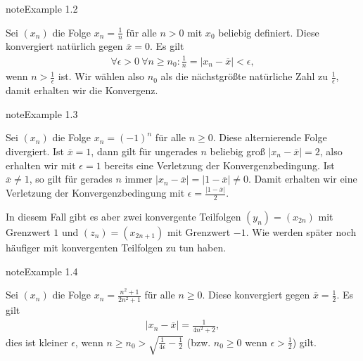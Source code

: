 \documentclass[letterpaper,10pt,english]{jupyterBook}
\begin{document}
\label{vorkurs/folgen:example-2}
\begin{sphinxadmonition}{note}{Example 1.2}



Sei \((x_n)\) die  Folge \(x_n = \frac{1}n \) für alle \(n>0\) mit \(x_0\) beliebig definiert. Diese konvergiert natürlich gegen \(\overline{x} = 0\). Es gilt
\begin{equation*}
\begin{split} \forall \epsilon > 0 ~\forall n \geq n_0:  \frac{1}n = \vert x_n - \overline{x}\vert < \epsilon, \end{split}
\end{equation*}
wenn \(n > \frac{1}\epsilon\) ist. Wir wählen also \(n_0\) als die nächstgrößte natürliche Zahl zu \(\frac{1}\epsilon\), damit erhalten wir die Konvergenz.
\end{sphinxadmonition}
\label{vorkurs/folgen:example-3}
\begin{sphinxadmonition}{note}{Example 1.3}



Sei \((x_n)\) die  Folge \(x_n = (-1)^n \) für alle \(n\geq 0\). Diese alternierende Folge divergiert. Ist \(\overline{x} = 1\), dann gilt für ungerades \(n\) beliebig groß \(\vert x_n - \overline{x}\vert = 2\), also erhalten wir mit \(\epsilon =1\) bereits eine Verletzung der Konvergenzbedingung. Ist \(\overline{x} \neq 1\), so gilt für gerades \(n\) immer \(\vert x_n - \overline{x} \vert =  \vert 1-\overline{x} \vert \neq 0\). Damit erhalten wir eine Verletzung der Konvergenzbedingung mit \(\epsilon = \frac{\vert 1-\overline{x} \vert}2\).

In diesem Fall gibt es aber zwei konvergente Teilfolgen \((y_n) = (x_{2n})\) mit Grenzwert \(1\) und \((z_n) = (x_{2n+1})\) mit Grenzwert \(-1\). Wie werden später noch häufiger mit konvergenten Teilfolgen zu tun haben.
\end{sphinxadmonition}
\label{vorkurs/folgen:example-4}
\begin{sphinxadmonition}{note}{Example 1.4}



Sei \((x_n)\) die  Folge \(x_n = \frac{n^2+1}{2n^2+1} \) für alle \(n\geq 0\). Diese konvergiert  gegen \(\overline{x} = \frac{1}2\). Es gilt
\begin{equation*}
\begin{split} \vert x_n - \overline{x}\vert = \frac{1}{4n^2+2}, \end{split}
\end{equation*}
dies ist kleiner \(\epsilon\), wenn \(n \geq n_0 > \sqrt{\frac{1}{4\epsilon}-\frac{1}2}\) (bzw. \(n_0 \geq 0\) wenn \(\epsilon > \frac{1}2\)) gilt.
\end{sphinxadmonition}
\end{document}
